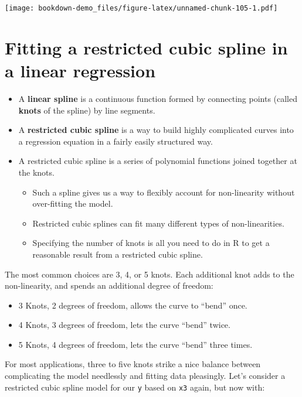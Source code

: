\documentclass[]{book}
\providecommand{\tightlist}{%
  \setlength{\itemsep}{0pt}\setlength{\parskip}{0pt}}
\theoremstyle{definition}
\theoremstyle{definition}
\theoremstyle{definition}
\theoremstyle{remark}
\begin{document}
\texttt{[image: bookdown-demo\_files/figure-latex/unnamed-chunk-105-1.pdf]}

\section{Fitting a restricted cubic spline in a linear
regression}\label{fitting-a-restricted-cubic-spline-in-a-linear-regression}

\begin{itemize}
\tightlist
\item
  A \textbf{linear spline} is a continuous function formed by connecting
  points (called \textbf{knots} of the spline) by line segments.
\item
  A \textbf{restricted cubic spline} is a way to build highly
  complicated curves into a regression equation in a fairly easily
  structured way.
\item
  A restricted cubic spline is a series of polynomial functions joined
  together at the knots.

  \begin{itemize}
  \tightlist
  \item
    Such a spline gives us a way to flexibly account for non-linearity
    without over-fitting the model.
  \item
    Restricted cubic splines can fit many different types of
    non-linearities.
  \item
    Specifying the number of knots is all you need to do in R to get a
    reasonable result from a restricted cubic spline.
  \end{itemize}
\end{itemize}

The most common choices are 3, 4, or 5 knots. Each additional knot adds
to the non-linearity, and spends an additional degree of freedom:

\begin{itemize}
\tightlist
\item
  3 Knots, 2 degrees of freedom, allows the curve to ``bend'' once.
\item
  4 Knots, 3 degrees of freedom, lets the curve ``bend'' twice.
\item
  5 Knots, 4 degrees of freedom, lets the curve ``bend'' three times.
\end{itemize}

For most applications, three to five knots strike a nice balance between
complicating the model needlessly and fitting data pleasingly. Let's
consider a restricted cubic spline model for our \texttt{y} based on
\texttt{x3} again, but now with:
\end{document}
